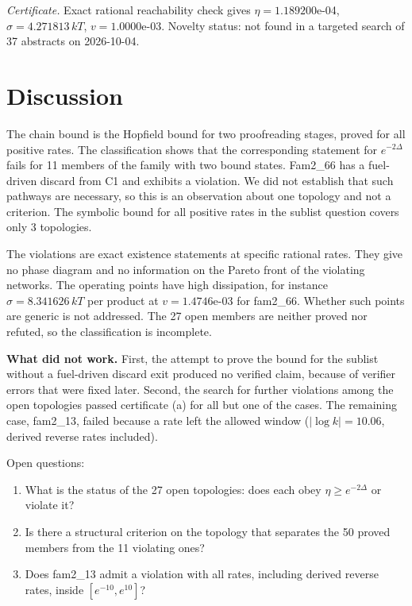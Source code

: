 \documentclass[10pt,twocolumn]{article}
\theoremstyle{definition}\newtheorem{definition}{Definition}\newtheorem{example}{Example}
\begin{document}
\emph{Certificate.} Exact rational reachability check gives \(\eta = 1.189200\)e-04, \(\sigma = 4.271813\,kT\), \(v = 1.0000\)e-03. Novelty status: not found in a targeted search of 37 abstracts on 2026-10-04.

\section{Discussion}\label{discussion}

The chain bound is the Hopfield bound for two proofreading stages, proved for all positive rates. The classification shows that the corresponding statement for \(e^{-2\Delta}\) fails for 11 members of the family with two bound states. Fam2\_66 has a fuel-driven discard from C1 and exhibits a violation. We did not establish that such pathways are necessary, so this is an observation about one topology and not a criterion. The symbolic bound for all positive rates in the sublist question covers only 3 topologies.

The violations are exact existence statements at specific rational rates. They give no phase diagram and no information on the Pareto front of the violating networks. The operating points have high dissipation, for instance \(\sigma = 8.341626\,kT\) per product at \(v = 1.4746\)e-03 for fam2\_66. Whether such points are generic is not addressed. The 27 open members are neither proved nor refuted, so the classification is incomplete.

\textbf{What did not work.} First, the attempt to prove the bound for the sublist without a fuel-driven discard exit produced no verified claim, because of verifier errors that were fixed later. Second, the search for further violations among the open topologies passed certificate (a) for all but one of the cases. The remaining case, fam2\_13, failed because a rate left the allowed window (\(|\log k| = 10.06\), derived reverse rates included).

Open questions:

\begin{enumerate}
\def\labelenumi{(\roman{enumi})}
\item
  What is the status of the 27 open topologies: does each obey \(\eta \geq e^{-2\Delta}\) or violate it?
\item
  Is there a structural criterion on the topology that separates the 50 proved members from the 11 violating ones?
\item
  Does fam2\_13 admit a violation with all rates, including derived reverse rates, inside \([e^{-10}, e^{10}]\)?
\end{enumerate}
\end{document}
